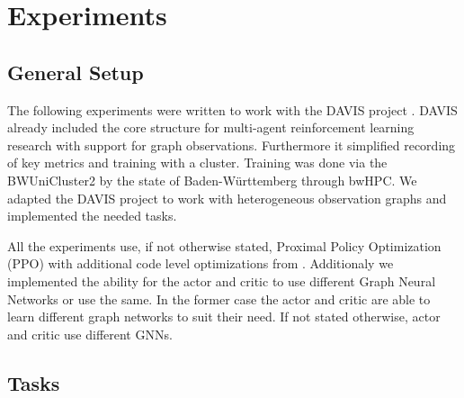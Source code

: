 
\chapter{Experiments}
\label{ch:Experiments}
\section{General Setup}
The following experiments were written to work with the DAVIS project \citet{DAVIS2021}. DAVIS already included the core structure for multi-agent reinforcement learning research with support for graph observations. Furthermore it simplified recording of key metrics and training with a cluster. Training was done via the BWUniCluster2 by the state of Baden-Württemberg through bwHPC. We adapted the DAVIS project to work with heterogeneous observation graphs and implemented the needed tasks. \par
All the experiments use, if not otherwise stated, Proximal Policy Optimization (PPO) \citet{SchulmanWDRK17} with additional code level optimizations from \citet{PPOHacks2020}. Additionaly we implemented the ability for the actor and critic to use different Graph Neural Networks or use the same. In the former case the actor and critic are able to learn different graph networks to suit their need. If not stated otherwise, actor and critic use different GNNs.



\section{Tasks}
